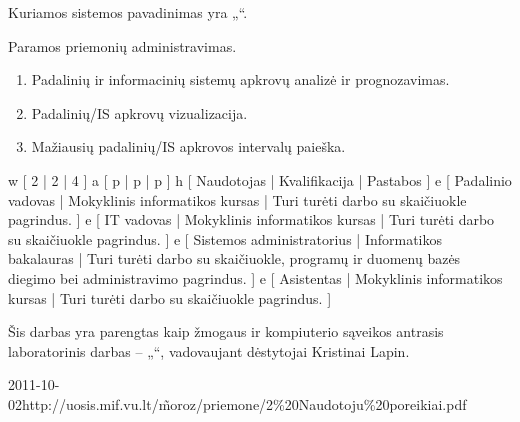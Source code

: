 Kuriamos sistemos pavadinimas yra „\systemname“.

Paramos priemonių administravimas.

\begin{enumerate}
  \item Padalinių ir informacinių sistemų apkrovų analizė ir prognozavimas.
  \item Padalinių/IS apkrovų vizualizacija.
  \item Mažiausių padalinių/IS apkrovos intervalų paieška.
\end{enumerate}


\xtable
{
  w [ 2 | 2 | 4 ]
  a [ p | p | p ]
  h [ Naudotojas | Kvalifikacija | Pastabos ]
  e [ Padalinio vadovas | Mokyklinis informatikos kursas
  | Turi turėti darbo su skaičiuokle pagrindus.
  ]
  e [ IT vadovas | Mokyklinis informatikos kursas
  | Turi turėti darbo su skaičiuokle pagrindus.
  ]
  e [ Sistemos administratorius | Informatikos bakalauras
  | Turi turėti darbo su skaičiuokle, programų ir duomenų bazės diegimo
  bei administravimo pagrindus.
  ]
  e [ Asistentas | Mokyklinis informatikos kursas
  | Turi turėti darbo su skaičiuokle pagrindus.
  ]
}

Šis darbas yra parengtas kaip žmogaus ir kompiuterio sąveikos
antrasis laboratorinis darbas – „\docname“, vadovaujant
dėstytojai Kristinai Lapin.

\xdoclist
{
  {2011-10-02}{http://uosis.mif.vu.lt/\~moroz/priemone/2\%20Naudotoju\%20poreikiai.pdf}
}
